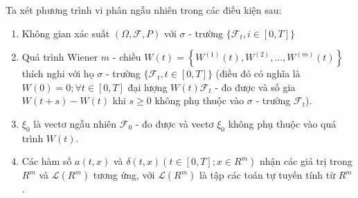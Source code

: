 \documentclass[14pt,a4paper]{article}
\numberwithin{equation}{section}
\begin{document}
Ta xét phương trình vi phân ngẫu nhiên trong các điều kiện sau:
\begin{enumerate}[(1)]
	\item Không gian xác suất $(\Omega,\mathscr{F},P)$ với $\sigma$ - trường $\{\mathscr{F}_t,i\in [0,T]\}$
	\item Quá trình Wiener $m$ - chiều $W(t)=\left\{W^{(1)}(t),W^{(2)},...,W^{(m)}(t) \right\}$ thích nghi với họ $\sigma$ - trường $\{\mathscr{F}_t,t\in [0,T] \}$ (điều đó có nghĩa là $W(0)=0;\forall t\in[0,T]$ đại lượng $W(t)\mathscr{F}_t$ - đo được và số gia $W(t+s)-W(t)$ khi $s\geq0$ không phụ thuộc vào $\sigma$ - trường $\mathscr{F}_t$).
	\item $\xi_0$ là vectơ ngẫu nhiên $\mathscr{F}_0$ - đo được và vectơ $\xi_0$ không phụ thuộc vào quá trình $W(t)$.
	\item Các hàm số $a(t,x)$ và $\delta(t,x)\left(t\in [0,T];x\in R^m \right)$ nhận các giá trị trong $R^m$ và $\mathscr{L}(R^m)$ tương ứng, với $\mathscr{L}(R^m)$ là tập các toán tự tuyến tính từ $R^m$.\\
\end{enumerate}
\end{document}

